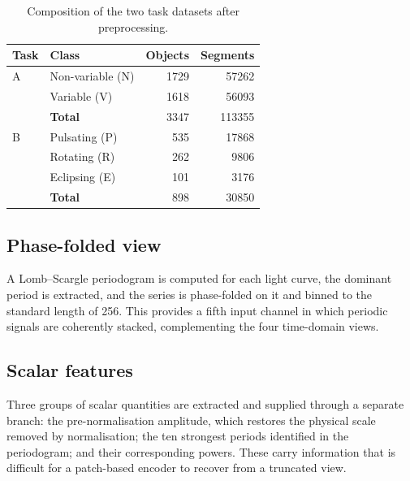 \documentclass{aa}
\begin{document}
    \begin{table}[!t]
        \caption{Composition of the two task datasets after preprocessing.}
        \label{tab:datasets}
        \centering
        \small
        \begin{tabular}{llrr}
            \toprule
            Task & Class            & Objects    & Segments     \\
            \midrule
            A    & Non-variable (N) & \num{1729} & \num{57262}  \\
            & Variable (V)     & \num{1618} & \num{56093}  \\
            & \textbf{Total}   & \num{3347} & \num{113355} \\
            \midrule
            B    & Pulsating (P)    & 535        & \num{17868}  \\
            & Rotating (R)     & 262        & \num{9806}   \\
            & Eclipsing (E)    & 101        & \num{3176}   \\
            & \textbf{Total}   & 898        & \num{30850}  \\
            \bottomrule
        \end{tabular}
    \end{table}

    \subsection{Phase-folded view}

    A Lomb--Scargle periodogram \citep{Lomb1976,Scargle1982} is computed for each light
    curve, the dominant period is extracted, and the series is phase-folded on it and binned
    to the standard length of 256. This provides a fifth input channel in which periodic
    signals are coherently stacked, complementing the four time-domain views.

    \subsection{Scalar features}
    \label{sec:scalars}

    Three groups of scalar quantities are extracted and supplied through a separate branch:
    the pre-normalisation amplitude, which restores the physical scale removed by
    normalisation; the ten strongest periods identified in the periodogram; and their
    corresponding powers. These carry information that is difficult for a patch-based
    encoder to recover from a truncated view.
\end{document}
